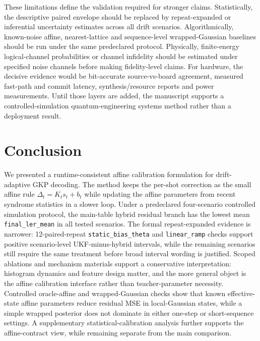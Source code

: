 \documentclass[11pt]{article}
\newcommand{\softwarehil}{controlled simulation}
\newcommand{\finalLER}{\texttt{final\_ler\_mean}}
\begin{document}
These limitations define the validation required for stronger claims.
Statistically, the descriptive paired envelope should be replaced by
repeat-expanded or inferential uncertainty estimates across all drift
scenarios.  Algorithmically, known-noise affine, nearest-lattice and
sequence-level wrapped-Gaussian baselines should be run under the same
predeclared protocol.  Physically, finite-energy logical-channel probabilities
or channel infidelity should be estimated under specified noise channels before
making fidelity-level claims.  For hardware, the decisive evidence would be
bit-accurate source-vs-board agreement, measured fast-path and commit latency,
synthesis/resource reports and power measurements.  Until those layers are
added, the manuscript supports a controlled-simulation quantum-engineering
systems method rather than a deployment result.

\section{Conclusion}

We presented a runtime-consistent affine calibration formulation for
drift-adaptive GKP decoding.  The method keeps the per-shot correction as the
small affine rule \(\Delta_t=K_t s_t+b_t\) while updating the affine
parameters from recent syndrome statistics in a slower loop.  Under a
predeclared four-scenario \softwarehil{} protocol, the main-table hybrid
residual branch has the lowest mean \finalLER{} in all tested scenarios.
The formal repeat-expanded evidence is narrower: 12-paired-repeat
\texttt{static\_bias\_theta} and \texttt{linear\_ramp} checks support positive
scenario-level UKF-minus-hybrid intervals, while the remaining scenarios still
require the same treatment before broad interval wording is justified.
Scoped ablations and mechanism materials support a conservative
interpretation: histogram dynamics and feature design matter, and the more
general object is the affine calibration interface rather than
teacher-parameter necessity.  Controlled
oracle-affine and wrapped-Gaussian checks show that known effective-state
affine parameters reduce residual MSE in local-Gaussian states, while a simple
wrapped posterior does not dominate in either one-step or short-sequence
settings.  A supplementary statistical-calibration analysis further supports
the affine-contract view, while remaining separate from the main comparison.
\end{document}
